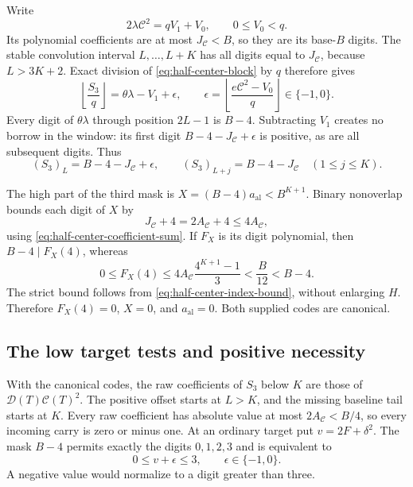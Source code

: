 Write
\[
 2\lambda\mathcal C^2=qV_1+V_0,\qquad0\le V_0<q.
\]
Its polynomial coefficients are at most $J_{\mathcal C}<B$, so
they are its base-$B$ digits. The stable convolution interval
$L,\ldots,L+K$ has all digits equal to $J_{\mathcal C}$, because
$L>3K+2$. Exact division of \eqref{eq:half-center-block} by $q$
therefore gives
\[
 \left\lfloor\frac{S_3}{q}\right\rfloor
 =\theta\lambda-V_1+\epsilon,\qquad
 \epsilon=\left\lfloor
 \frac{e\mathcal C^2-V_0}{q}\right\rfloor\in\{-1,0\}.
\]
Every digit of $\theta\lambda$ through position $2L-1$ is $B-4$.
Subtracting $V_1$ creates no borrow in the window: its first digit
$B-4-J_{\mathcal C}+\epsilon$ is positive, as are all subsequent
digits. Thus
\begin{equation}\label{eq:half-center-high-digits}
 (S_3)_L=B-4-J_{\mathcal C}+\epsilon,\qquad
 (S_3)_{L+j}=B-4-J_{\mathcal C}\quad(1\le j\le K).
\end{equation}

The high part of the third mask is
$X=(B-4)a_{\mathrm{al}}<B^{K+1}$. Binary nonoverlap bounds each
digit of $X$ by
\[
 J_{\mathcal C}+4=2A_{\mathcal C}+4\le4A_{\mathcal C},
\]
using \eqref{eq:half-center-coefficient-sum}. If $F_X$ is its digit
polynomial, then $B-4\mid F_X(4)$, whereas
\[
 0\le F_X(4)\le
 4A_{\mathcal C}\frac{4^{K+1}-1}{3}<\frac B{12}<B-4.
\]
The strict bound follows from
\eqref{eq:half-center-index-bound}, without enlarging $H$.
Therefore $F_X(4)=0$, $X=0$, and $a_{\mathrm{al}}=0$.
Both supplied codes are canonical.

\subsection{The low target tests and positive necessity}

With the canonical codes, the raw coefficients of $S_3$ below $K$
are those of $\mathcal D(T)\mathcal C(T)^2$. The positive offset
starts at $L>K$, and the missing baseline tail starts at $K$.
Every raw coefficient has absolute value at most
$2A_{\mathcal C}<B/4$, so every incoming carry is zero or minus one.
At an ordinary target put $v=2F+\delta^2$. The mask $B-4$ permits
exactly the digits $0,1,2,3$ and is equivalent to
\begin{equation}\label{eq:half-center-allowed}
 0\le v+\epsilon\le3,\qquad\epsilon\in\{-1,0\}.
\end{equation}
A negative value would normalize to a digit greater than three.

